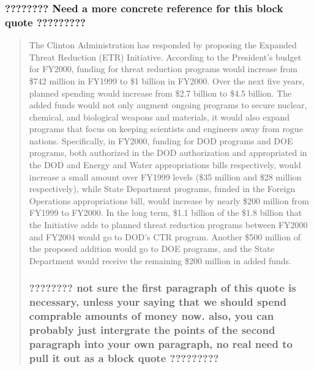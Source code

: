 \documentclass{report}
\begin{document}
\subsubsection{????????  Need a more concrete reference for this block quote   ?????????}


\blockquote{The Clinton Administration has responded by proposing the Expanded Threat Reduction (ETR) Initiative. According to the President's budget for FY2000, funding for threat reduction programs would increase from \$742 million in FY1999 to \$1 billion in FY2000. Over the next five years, planned spending would increase from \$2.7 billion to \$4.5 billion. The added funds would not only augment ongoing programs to secure nuclear, chemical, and biological weapons and materials, it would also expand programs that focus on keeping scientists and engineers away from rogue nations. Specifically, in FY2000, funding for DOD programs and DOE programs, both authorized in the DOD authorization and appropriated in the DOD and Energy and Water appropriations bills respectively, would increase a small amount over FY1999 levels (\$35 million and \$28 million respectively), while State Department programs, funded in the Foreign Operations appropriations bill, would increase by nearly \$200 million from FY1999 to FY2000. In the long term, \$1.1 billion of the \$1.8 billion that the Initiative adds to planned threat reduction programs between FY2000 and FY2004 would go to DOD's CTR program. Another \$500 million of the proposed addition would go to DOE programs, and the State Department would receive the remaining \$200 million in added funds.

\subsubsection{???????? not sure the first paragraph of this quote is necessary, unless your saying that we should spend comprable amounts of money now. also, you can probably just intergrate the points of the second paragraph into your own paragraph, no real need to pull it out as a block quote  ?????????} 

}
\end{document}
